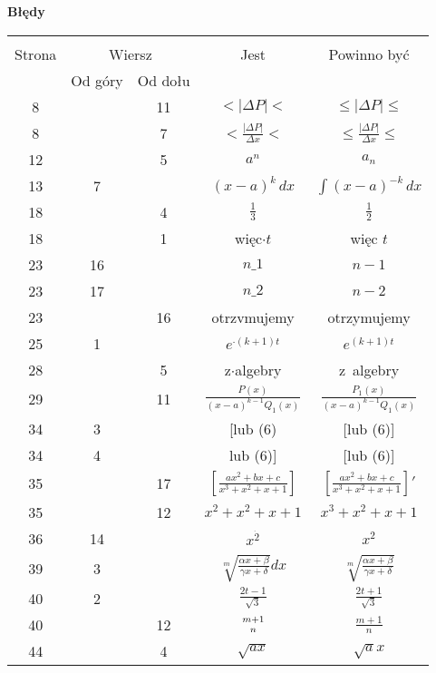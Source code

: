 \documentclass[a4paper,11pt]{article}
\newcommand{\fr}{\frac}
\newcommand{\sq}{\sqrt}
\newcommand{\al}{\alpha}
\newcommand{\be}{\beta}
\newcommand{\del}{\delta}
\newcommand{\Del}{\Delta}
\newcommand{\ga}{\gamma}
\newcommand{\tb}{\textbf}
\newcommand{\Center}[1]{\begin{center} #1 \end{center}}
\newcommand{\CenterTB}[1]{\Center{\tb{#1}}}
\begin{document}
\CenterTB{Błędy}
\begin{center}
  \begin{tabular}{|c|c|c|c|c|}
    \hline
    & \multicolumn{2}{c|}{} & & \\
    Strona & \multicolumn{2}{c|}{Wiersz}& Jest
                              & Powinno być \\ \cline{2-3}
    & Od góry & Od dołu &  &  \\ \hline
    8 & & 11 & $< | \Del P | <$ & $\leq | \Del P | \leq$ \\
    8 & & 7 & $< \fr{ | \Del P | }{ \Del x } <$
           & $\leq \frac{ | \Del P | }{ \Del x } \leq$ \\
    12 & & 5 & $a^{ n }$ & $a_{ n }$ \\
    13 & 7 & & $( x - a )^{ k }\, dx$ & $\int ( x - a )^{ -k }\, dx$ \\
    18 & & 4 & $\fr{ 1 }{ 3 }$ & $\fr{ 1 }{ 2 }$ \\
    18 & & 1 & więc$\cdot t$ & więc $t$ \\
    23 & 16 & & $n \_ 1$ & $n - 1$ \\
    23 & 17 & & $n \_ 2$ & $n - 2$ \\
    23 & & 16 & otrzvmujemy & otrzymujemy \\
    25 & 1 & & $e^{ \cdot (k + 1) t}$ & $e^{ (k + 1) t}$ \\
    28 & & 5 & z$\cdot$algebry & z~algebry \\
    29 & & 11 & $\fr{ P(x) }{ (x - a)^{k - 1} Q_{ 1 }(x) }$
           & $\fr{ P_{ 1 }(x) }{ (x - a)^{k - 1} Q_{ 1 }(x) }$ \\
    34 & 3 & & [lub (6) & [lub (6)] \\
    34 & 4 & & lub (6)] & [lub (6)] \\
    35 & & 17 & $\left[ \fr{ a x^{ 2 } + b x + c }
                { x^{ 3 } + x^{ 2 } + x + 1 } \right]$
           & $\left[ \fr{ a x^{ 2 } + b x + c }
             { x^{ 3 } + x^{ 2 } + x + 1 } \right]'$ \\
    35 & & 12 & $x^{ 2 } + x^{ 2 } + x + 1$
           & $x^{ 3 } + x^{ 2 } + x + 1$ \\
    36 & 14 & & $x^{ \dot{ 2 } }$ & $x^{ 2 }$ \\
    39 & 3 & & $\sq[ m ]{ \fr{ \al x + \be }{ \ga x + \del } } dx$
           & $\sq[ m ]{ \fr{ \al x + \be }{ \ga x + \del } }$ \\
    40 & 2 & & $\fr{ 2t - 1 }{ \sq{ 3 } }$ & $\fr{ 2t + 1 }{ \sq{ 3 } }$ \\
    40 & & 12 & ${ m + 1 \atop n }$ & $\fr{ m + 1 }{ n }$ \\
    44 & & 4 & $\sq{ ax }$ & $\sq{ a } x$ \\ \hline
  \end{tabular}


\end{center}
\end{document}
